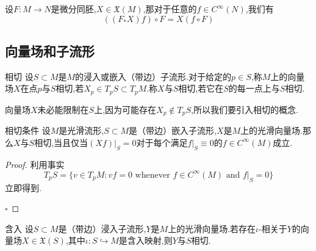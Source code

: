 \documentclass[../../几何与拓扑.tex]{subfiles}
\begin{document}
\begin{corollary}
    设$F:M\to N$是微分同胚,$X \in \mathfrak{X}\left( M \right)$,那对于任意的$f \in C^{\infty }\left( N \right)$,我们有 $$ \left( \left( F_{*}X \right) f \right) \circ F= X\left( f\circ F \right) $$
\end{corollary}

\subsection{向量场和子流形}

\begin{definition}{相切}
    设$S\subset M$是$M$的浸入或嵌入（带边）子流形.对于给定的$p \in S$,称$M$上的向量场$X$在点$p$与$S$相切,若$X_{p}\in T_{p}S\subset T_{p}M$.称$X$与$S$相切,若它在$S$的每一点上与$S$相切.
\end{definition}

\begin{note}

    向量场$X$未必能限制在$S$上,因为可能存在$X_{p}\not\in T_{p}S$,所以我们要引入相切的概念.

\end{note}

\begin{proposition}{相切条件}
    设$M$是光滑流形,$S\subset M$是（带边）嵌入子流形,$X$是$M$上的光滑向量场.那么$X$与$S$相切,当且仅当$\left( Xf \right)|_{S}=0$对于每个满足$f|_{S}\equiv 0$的$f \in C^{\infty}\left( M \right)$成立.
\end{proposition}

\begin{proof}
    利用事实 $$ T_{p}S =\{ v \in T_{p}M: vf=0 \text{ whenever }f \in C^{\infty}\left( M \right) \text{ and }f|_{S}=0 \}$$立即得到.

    \hfill $\square$
\end{proof}

\begin{proposition}{含入}
    设$S\subset M$是（带边）浸入子流形,$Y$是$M$上的光滑向量场.若存在$\iota$-相关于$Y$的向量场$X \in \mathfrak{X}\left( S \right)$,其中$\iota:S \hookrightarrow M$是含入映射,则$Y$与$S$相切.
\end{proposition}
\end{document}
